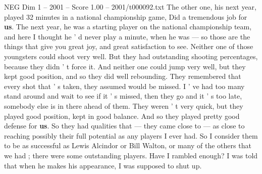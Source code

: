 \begin{textsample}{NEG Dim 1 – 2001 – Score 1.00 – 2001/t000092.txt}
The other one, his next year, played 32 minutes in a national championship game, Did a tremendous job for \textbf{us}.
The next year, he was a starting player on the national championship team, and here I thought he ' d never play a minute, when he was — so those are the things that give you great joy, and great satisfaction to see.
Neither one of those youngsters could shoot very well.
But they had outstanding shooting percentages, because they didn ' t force it.
And neither one could jump very well, but they kept good position, and so they did well rebounding.
They remembered that every shot that ' s taken, they assumed would be missed.
I ' ve had too many stand around and wait to see if it ' s missed, then they go and it ' s too late, somebody else is in there ahead of them.
They weren ' t very quick, but they played good position, kept in good balance.
And so they played pretty good defense for \textbf{us}.
So they had qualities that — they came close to — as close to reaching possibly their full potential as any players I ever had.
So I consider them to be as successful as Lewis Alcindor or Bill Walton, or many of the others that we had ; there were some outstanding players.
Have I rambled enough?
I was told that when he makes his appearance, I was supposed to shut up.

\end{textsample}
